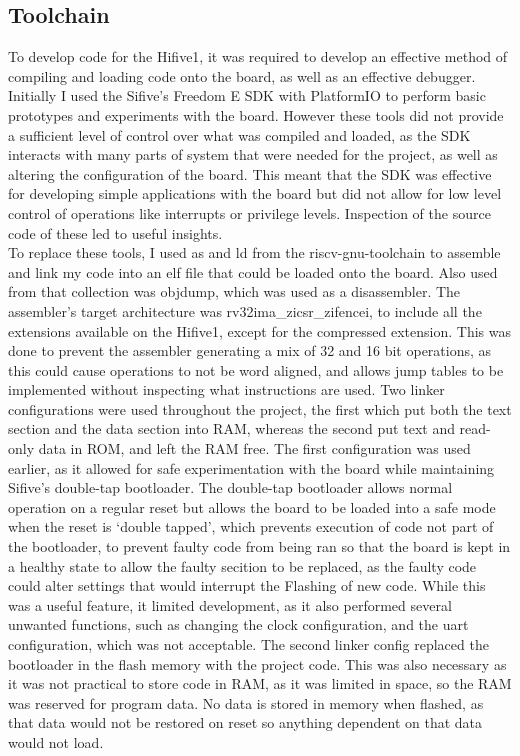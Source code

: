 \subsection{Toolchain}
To develop code for the Hifive1, it was required to develop an effective method of compiling and loading code onto the board, as well as an effective debugger. Initially I used the Sifive's Freedom E SDK with PlatformIO to perform basic prototypes and experiments with the board. However these tools did not provide a sufficient level of control over what was compiled and loaded, as the SDK interacts with many parts of system that were needed for the project, as well as altering the configuration of the board. This meant that the SDK was effective for developing simple applications with the board but did not allow for low level control of operations like interrupts or privilege levels. Inspection of the source code of these led to useful insights.\\
To replace these tools, I used as and ld from the riscv-gnu-toolchain to assemble and link my code into an elf file that could be loaded onto the board. Also used from that collection was objdump, which was used as a disassembler. The assembler's target architecture was rv32ima\_zicsr\_zifencei, to include all the extensions available on the Hifive1, except for the compressed extension. This was done to prevent the assembler generating a mix of 32 and 16 bit operations, as this could cause operations to not be word aligned, and allows jump tables to be implemented without inspecting what instructions are used. Two linker configurations were used throughout the project, the first which put both the text section and the data section into RAM, whereas the second put text and read-only data in ROM, and left the RAM free. The first configuration was used earlier, as it allowed for safe experimentation with the board while maintaining Sifive's double-tap bootloader. The double-tap bootloader allows normal operation on a regular reset but allows the board to be loaded into a safe mode when the reset is `double tapped', which prevents execution of code not part of the bootloader, to prevent faulty code from being ran so that the board is kept in a healthy state to allow the faulty secition to be replaced, as the faulty code could alter settings that would interrupt the Flashing of new code. While this was a useful feature, it limited development, as it also performed several unwanted functions, such as changing the clock configuration, and the uart configuration, which was not acceptable. The second linker config replaced the bootloader in the flash memory with the project code. This was also necessary as it was not practical to store code in RAM, as it was limited in space, so the RAM was reserved for program data. No data is stored in memory when flashed, as that data would not be restored on reset so anything dependent on that data would not load.\\
